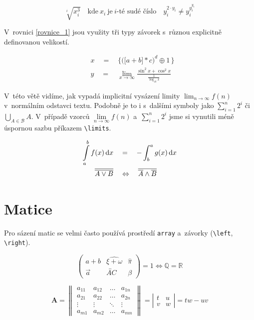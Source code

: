 \documentclass[a4paper, 11pt, twocolumn]{article}
\theoremstyle{plain}
\theoremstyle{plain}
\begin{document}
$$
\sqrt[i]{x_i^3}\quad\text{kde}\ x_i\ \text{je}\ i\text{-té sudé číslo} \quad y_i^{2\cdot y_i}\neq y_i^{y_i^{y_i}}
$$

V~rovnici \eqref{rovnice_1} jsou využity tři typy závorek s~různou explicitně definovanou velikostí.

\begin{align} \label{rovnice_1}
&x\quad=\quad\bigg\{\Big(\big[a + b\big] * c\Big)^d \oplus 1 \,\bigg\}\\
\nonumber &y\quad=\quad\lim_{x\to\infty}\frac{\sin^2x+ \cos^2x}{\frac{1}{\log_{10}{x}}}
\end{align}

V~této větě vidíme, jak vypadá implicitní vysázení limity $\lim_{n\to\infty}f(n)$ v~normálním odstavci textu. Podobně je to i s~dalšími symboly jako $\sum_{i=1}^{n} 2^{i}$ či $\bigcup_{A\in \mathcal{B}} A$. V~případě vzorců $\lim\limits_{n\to\infty} f(n)$ a~$\sum\limits_{i=1}^{n} 2^{i}$ jsme si vynutili méně úspornou sazbu příkazem \verb|\limits|.


\begin{align}\label{rovnice_2}
\int\displaylimits_{a}^{b}f(x)\,\mathrm{d}x\quad&=\quad-\int_{b}^{a}g(x)\,\mathrm{d}x\\
\overline{\overline{A\lor B}}\quad&\Leftrightarrow\quad \overline{\overline{A}\land\overline{B}}
\end{align}

\section{Matice}
Pro sázení matic se velmi často používá prostředí \verb|array| a~závorky (\verb|\left|, \verb|\right|).

$$
\left(
\begin{array}{ccc}
a + b & \widehat{\xi + \omega} & \hat{\pi}\\
\vec{a}&\overleftrightarrow{AC}&\beta
\end{array}
\right)=1\!\iff\!\mathbb{Q}=\mathbb{R}
$$

$$
\mathbf{A}=\left\|
\begin{array}{cccc}
a_{11} & a_{12} & \dots & a_{1n}\\
a_{21} & a_{22} & \dots & a_{2n}\\
\vdots & \vdots &\ddots& \vdots\\
a_{m1} & a_{m2} & \dots & a_{mn}
\end{array}
\right\|=
\left|
\begin{array}{ll}
t&u\\
v&w
\end{array} 
\right|=tw-uv
$$
\end{document}
